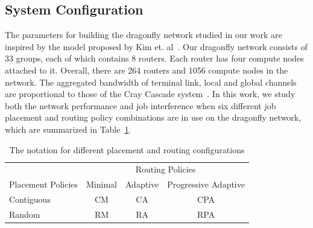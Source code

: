 \documentclass[conference,compsoc]{IEEEtran}
\begin{document}
\subsection{System Configuration}
\label{sec: simulation configuration}

The parameters for building the dragonfly network studied in our work are inspired by the model proposed by Kim et. al~\cite{kim-micro}. Our dragonfly network consists of 33 groups, each of which contains 8 routers. Each router has four compute nodes attached to it. Overall, there are 264 routers and 1056 compute nodes in the network. The aggregated bandwidth of terminal link,  local and global channels are proportional to those of the Cray Cascade system~\cite{faanes}. In this work, we study both the network performance and job interference when six different job placement and routing policy combinations are in use on the dragonfly network, which are summarized in Table~\ref{tab: placement routing configs}. 


\begin{table}[ht]
\begin{center}
\caption{The notation for different placement and routing configurations} 
\label{tab: placement routing configs}
\begin{tabular}{l c c c }
\toprule %
\toprule
&\multicolumn{3}{c}{Routing Policies} \\ 
\cmidrule(l){2-4}
Placement Policies & Minimal & Adaptive & Progressive Adaptive\\ %
\midrule %
Contiguous  &  CM   &   CA   &  CPA   \\ %
\midrule
Random  &   RM  &   RA   &  RPA   \\ 
\midrule %
\bottomrule %
\end{tabular}
\end{center}
\end{table}
\end{document}
